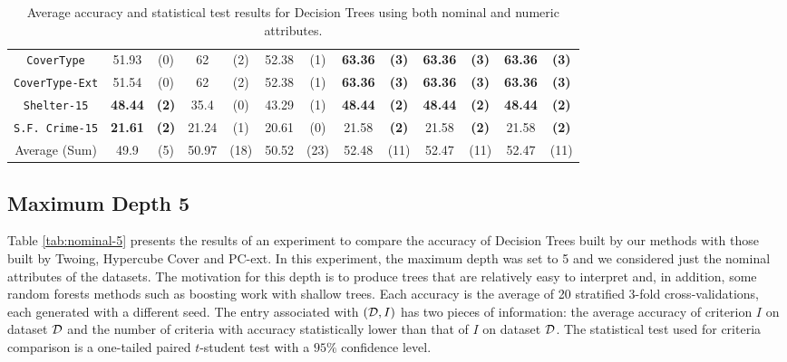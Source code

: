 \begin{table}
\begin{tabular}{c|cc|cc|cc|cc|cc|cc}
{\tt CoverType}    & 51.93          &  (0)      & 62         & (2)          & 52.38       &  (1)              & {\bf 63.36} &  {\bf (3)}   & {\bf 63.36} & {\bf (3)}& {\bf 63.36} & {\bf (3)} \\  
{\tt CoverType-Ext}& 51.54          &  (0)      & 62         & (2)          & 52.38       &  (1)              & {\bf 63.36} &  {\bf (3)}   & {\bf 63.36} & {\bf (3)}& {\bf 63.36} & {\bf (3)} \\  
{\tt Shelter-15}   & {\bf 48.44}    & {\bf (2)} & 35.4       & (0)          & 43.29       &  (1)              & {\bf 48.44} &  {\bf (2)}   & {\bf 48.44} & {\bf (2)}& {\bf 48.44} & {\bf (2)} \\   
{\tt S.F. Crime-15}& {\bf 21.61}    & {\bf (2)} & 21.24      & (1)          & 20.61       &  (0)              & 21.58       &  {\bf (2)}   & 21.58       & {\bf (2)}& 21.58       & {\bf (2)} \\ 
\hline
Average (Sum)      & 49.9           &  (5)      & 50.97      & (18)         & 50.52       &  (23)             & 52.48       &  (11)        & 52.47       &  (11)    & 52.47       & (11)

\end{tabular}
\caption{Average accuracy and statistical test results for  Decision Trees using both nominal and numeric attributes.}
\label{exp:numeric-1}
\normalsize
\end{table}



\subsection{Maximum Depth 5}
\label{subsec:depth-5}

Table \ref{tab:nominal-5} presents  the results of an experiment to
compare the accuracy of  Decision Trees built by  our methods with those built by Twoing, Hypercube Cover and PC-ext.
In this experiment, the maximum depth was set to 5 and we considered just the nominal attributes of the datasets. 
The motivation for this depth is to produce trees that
are relatively easy to interpret and, in addition, some random
forests methods such as boosting work with shallow trees.
Each accuracy is the average of 20 stratified 3-fold cross-validations,
each generated with a different seed.
The entry  associated with  $({\cal D},I)$ has two pieces of information: the average accuracy
of criterion $I$ on dataset ${\cal D}$ and the number of criteria
with accuracy   statistically lower than that of $I$ on dataset ${\cal D}$. 
The statistical test used for criteria comparison is a  one-tailed paired $t$-student test with a $95\% $ confidence level.

